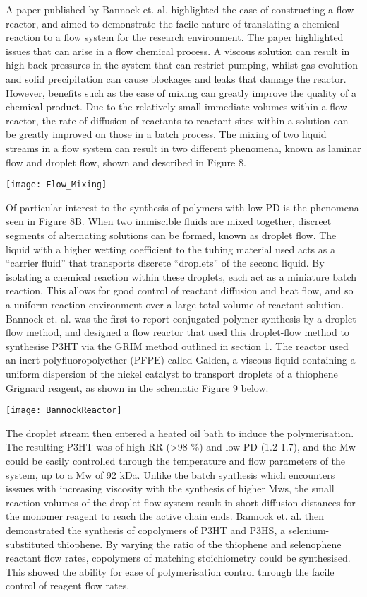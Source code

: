 A paper published by Bannock et. al. highlighted the ease of constructing a flow reactor, and aimed to demonstrate the facile nature of translating a chemical reaction to a flow system for the research environment. The paper highlighted issues that can arise in a flow chemical process. A viscous solution can result in high back pressures in the system that can restrict pumping, whilst gas evolution and solid precipitation can cause blockages and leaks that damage the reactor. However, benefits such as the ease of mixing can greatly improve the quality of a chemical product. Due to the relatively small immediate volumes within a flow reactor, the rate of diffusion of reactants to reactant sites within a solution can be greatly improved on those in a batch process. The mixing of two liquid streams in a flow system can result in two different phenomena, known as laminar flow and droplet flow, shown and described in Figure 8.

\texttt{[image: Flow\_Mixing]}

Of particular interest to the synthesis of polymers with low PD is the phenomena seen in Figure 8B. When two immiscible fluids are mixed together, discreet segments of alternating solutions can be formed, known as droplet flow. The liquid with a higher wetting coefficient to the tubing material used acts as a “carrier fluid” that transports discrete “droplets” of the second liquid. By isolating a chemical reaction within these droplets, each act as a miniature batch reaction. This allows for good control of reactant diffusion and heat flow, and so a uniform reaction environment over a large total volume of reactant solution. Bannock et. al. was the first to report conjugated polymer synthesis by a droplet flow method, and designed a flow reactor that used this droplet-flow method to synthesise P3HT via the GRIM method outlined in section 1. The reactor used an inert polyfluoropolyether (PFPE) called Galden, a viscous liquid containing a uniform dispersion of the nickel catalyst to transport droplets of a thiophene Grignard reagent, as shown in the schematic Figure 9 below. 

\texttt{[image: BannockReactor]}

The droplet stream then entered a heated oil bath to induce the polymerisation. The resulting P3HT was of high RR (\textgreater 98 \%) and low PD (1.2-1.7), and the Mw could be easily controlled through the temperature and flow parameters of the system, up to a Mw of 92 kDa. Unlike the batch synthesis which encounters isssues with increasing viscosity with the synthesis of higher Mws, the small reaction volumes of the droplet flow system result in short diffusion distances for the monomer reagent to reach the active chain ends. Bannock et. al. then demonstrated the synthesis of copolymers of P3HT and P3HS, a selenium-substituted thiophene. By varying the ratio of the thiophene and selenophene reactant flow rates, copolymers of matching stoichiometry could be synthesised. This showed the ability for ease of polymerisation control through the facile control of reagent flow rates.


